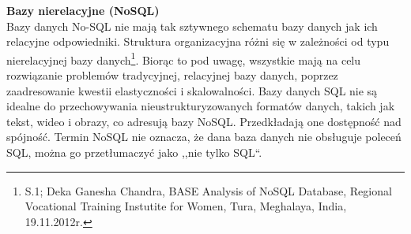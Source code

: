 \documentclass[12pt, a4paper, twoside, openany]{book}
\newcommand{\forceindent}{\leavevmode{\parindent=1.3em\indent}}
\begin{document}
\forceindent \textbf{Bazy nierelacyjne (NoSQL)}\\
\forceindent Bazy danych No-SQL nie mają tak sztywnego schematu bazy danych jak ich relacyjne odpowiedniki.
Struktura organizacyjna różni się w zależności od typu nierelacyjnej bazy danych\footnote{S.1; Deka Ganesha Chandra, BASE Analysis of NoSQL Database, Regional Vocational Training Instutite for Women, Tura, Meghalaya, India, 19.11.2012r.}.
Biorąc to pod uwagę, wszystkie mają na celu rozwiązanie problemów tradycyjnej, relacyjnej bazy danych, poprzez zaadresowanie kwestii elastyczności i skalowalności.
Bazy danych SQL nie są idealne do przechowywania nieustrukturyzowanych formatów danych, takich jak tekst, wideo i obrazy, co adresują bazy NoSQL.
Przedkładają one dostępność nad spójność.
Termin NoSQL nie oznacza, że dana baza danych nie obsługuje poleceń SQL, można go przetłumaczyć jako ,,nie tylko SQL``.
\end{document}
